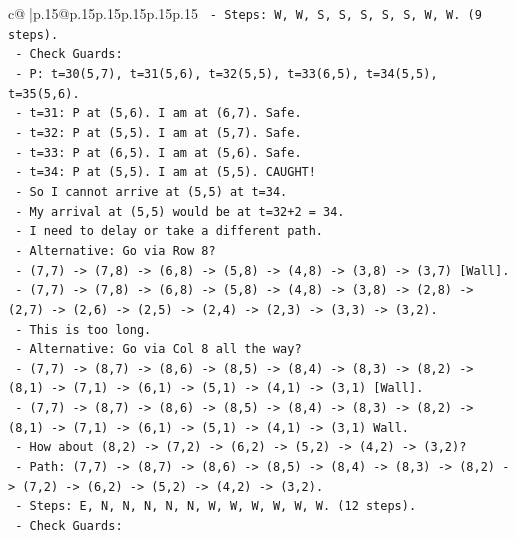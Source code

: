 \documentclass{article}
\begin{document}
{\begin{supertabular}{c@{$\;$}|p{.15\linewidth}@{}p{.15\linewidth}p{.15\linewidth}p{.15\linewidth}p{.15\linewidth}p{.15\linewidth}}
{{{\texttt{    {-} Steps: W, W, S, S, S, S, S, W, W. (9 steps).} \\
\texttt{    {-} Check Guards:} \\
\texttt{      {-} P: t=30(5,7), t=31(5,6), t=32(5,5), t=33(6,5), t=34(5,5), t=35(5,6).} \\
\texttt{        {-} t=31: P at (5,6). I am at (6,7). Safe.} \\
\texttt{        {-} t=32: P at (5,5). I am at (5,7). Safe.} \\
\texttt{        {-} t=33: P at (6,5). I am at (5,6). Safe.} \\
\texttt{        {-} t=34: P at (5,5). I am at (5,5). CAUGHT!} \\
\texttt{        {-} So I cannot arrive at (5,5) at t=34.} \\
\texttt{        {-} My arrival at (5,5) would be at t=32+2 = 34.} \\
\texttt{        {-} I need to delay or take a different path.} \\
\texttt{    {-} Alternative: Go via Row 8?} \\
\texttt{      {-} (7,7) {-}> (7,8) {-}> (6,8) {-}> (5,8) {-}> (4,8) {-}> (3,8) {-}> (3,7) {[}Wall{]}.} \\
\texttt{      {-} (7,7) {-}> (7,8) {-}> (6,8) {-}> (5,8) {-}> (4,8) {-}> (3,8) {-}> (2,8) {-}> (2,7) {-}> (2,6) {-}> (2,5) {-}> (2,4) {-}> (2,3) {-}> (3,3) {-}> (3,2).} \\
\texttt{      {-} This is too long.} \\
\texttt{    {-} Alternative: Go via Col 8 all the way?} \\
\texttt{      {-} (7,7) {-}> (8,7) {-}> (8,6) {-}> (8,5) {-}> (8,4) {-}> (8,3) {-}> (8,2) {-}> (8,1) {-}> (7,1) {-}> (6,1) {-}> (5,1) {-}> (4,1) {-}> (3,1) {[}Wall{]}.} \\
\texttt{      {-} (7,7) {-}> (8,7) {-}> (8,6) {-}> (8,5) {-}> (8,4) {-}> (8,3) {-}> (8,2) {-}> (8,1) {-}> (7,1) {-}> (6,1) {-}> (5,1) {-}> (4,1) {-}> (3,1) Wall.} \\
\texttt{      {-} How about (8,2) {-}> (7,2) {-}> (6,2) {-}> (5,2) {-}> (4,2) {-}> (3,2)?} \\
\texttt{      {-} Path: (7,7) {-}> (8,7) {-}> (8,6) {-}> (8,5) {-}> (8,4) {-}> (8,3) {-}> (8,2) {-}> (7,2) {-}> (6,2) {-}> (5,2) {-}> (4,2) {-}> (3,2).} \\
\texttt{      {-} Steps: E, N, N, N, N, N, W, W, W, W, W, W. (12 steps).} \\
\texttt{      {-} Check Guards:} \\
}}}
\end{supertabular}}
\end{document}
